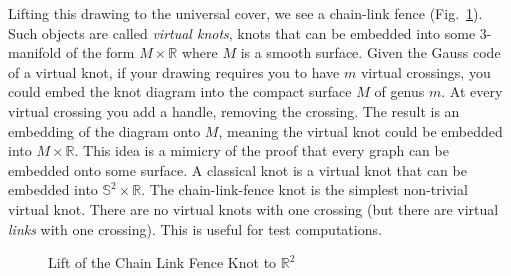 \documentclass{article}
\theoremstyle{plain}
\begin{document}
        Lifting this drawing to the universal cover, we see a chain-link fence
        (Fig.~\ref{fig:chain_link_fence_knot_on_flat_torus_universal_cover}).
        Such objects are called \textit{virtual knots}, knots that can be
        embedded into some 3-manifold of the form $M\times\mathbb{R}$ where
        $M$ is a smooth surface. Given the Gauss code of a virtual knot, if your
        drawing requires you to have $m$ virtual crossings, you could embed the
        knot diagram into the compact surface $M$ of genus $m$. At every virtual
        crossing you add a handle, removing the crossing. The result is an
        embedding of the diagram onto $M$, meaning the virtual knot could be
        embedded into $M\times\mathbb{R}$. This idea is a
        mimicry of the proof that every graph can be embedded onto some surface.
        A classical knot is a virtual knot that can be embedded into
        $\mathbb{S}^{2}\times\mathbb{R}$. The chain-link-fence knot is the
        simplest non-trivial virtual knot. There are no virtual knots with one
        crossing (but there are virtual \textit{links} with one crossing). This
        is useful for test computations.
        \begin{figure}
            \centering
            \caption{Lift of the Chain Link Fence Knot to $\mathbb{R}^{2}$}
            \label{fig:chain_link_fence_knot_on_flat_torus_universal_cover}
        \end{figure}
\end{document}
